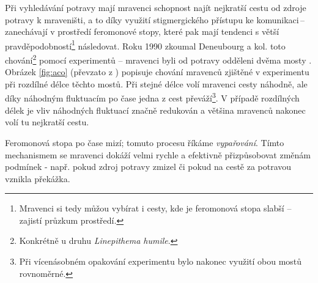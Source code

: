 \documentclass[a4paper,12pt]{article}
\begin{document}

Při vyhledávání potravy mají mravenci schopnost najít nejkratší cestu od zdroje potravy k mraveništi,
a to díky využití stigmergického přístupu ke komunikaci\,--\,zanechávají v prostředí
feromonové stopy, které pak mají tendenci s větší pravděpodobností\footnote{Mravenci si tedy můžou vybírat i
cesty, kde je feromonová stopa slabší -- zajistí průzkum prostředí.} následovat. Roku 1990 zkoumal
Deneubourg a kol. toto
chování\footnote{Konkrétně u druhu {\it Linepithema humile}.} pomocí experimentů -- mravenci byli od potravy
odděleni dvěma mosty \cite{Dorigo06antcolony}. Obrázek \ref{fig:aco} (převzato z \cite{Blum08SwarmOpt})
popisuje chování mravenců zjištěné v experimentu při rozdílné
délce těchto mostů. Při stejné délce volí mravenci cesty náhodně, ale díky náhodným fluktuacím po čase
jedna z cest převáží\footnote{Při vícenásobném opakování experimentu bylo nakonec využití obou mostů rovnoměrné.}.
V případě rozdílných délek je vliv náhodných fluktuací značně redukován a většina mravenců nakonec volí
tu nejkratší cestu.

Feromonová stopa po čase mizí; tomuto procesu říkáme {\it vypařování}. Tímto mechanismem se
mravenci dokáží velmi rychle a efektivně přizpůsobovat změnám podmínek - např. pokud zdroj
potravy zmizel či pokud na cestě za potravou vznikla překážka.
\end{document}
